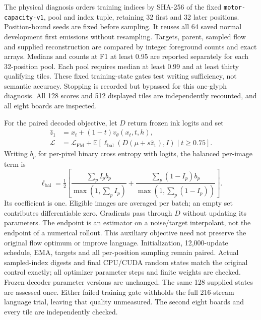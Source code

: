 The physical diagnosis orders training indices by SHA-256 of the fixed
\texttt{motor-capacity-v1}, pool and index tuple, retaining 32 first and 32
later positions. Position-bound seeds are fixed before sampling. It reuses
all 64 saved normal development first emissions without resampling. Targets,
parent, sampled flow and supplied reconstruction are compared by integer
foreground counts and exact arrays. Medians and counts at F1 at least 0.95
are reported separately for each 32-position pool. Each pool requires median
at least 0.99 and at least thirty qualifying tiles. These fixed training-state
gates test writing sufficiency, not semantic accuracy. Stopping is recorded
but bypassed for this one-glyph diagnosis. All 128 scores and 512 displayed
tiles are independently recounted, and all eight boards are inspected.

For the paired decoded objective, let $D$ return frozen ink logits and set
\begin{align}
 \widehat z_1&=x_t+(1-t)v_\theta(x_t,t,h),\\
 \mathcal L&=\mathcal L_\mathrm{FM}+
 \mathbb E[\ell_\mathrm{bal}(D(\mu+s\widehat z_1),I)\mid t\geq0.75].
\end{align}
Writing $b_p$ for per-pixel binary cross entropy with logits, the balanced
per-image term is
\[
 \ell_\mathrm{bal}=\tfrac12\left[
 \frac{\sum_p I_pb_p}{\max(1,\sum_p I_p)}+
 \frac{\sum_p(1-I_p)b_p}{\max(1,\sum_p(1-I_p))}\right].
\]
Its coefficient is one. Eligible images are averaged per batch; an empty set
contributes differentiable zero. Gradients pass through $D$ without updating
its parameters. The endpoint is an estimator on a noise/target interpolant,
not the endpoint of a numerical rollout. This auxiliary objective need not
preserve the original flow optimum or improve language. Initialization,
12,000-update schedule, EMA, targets and all per-position sampling remain
paired. Actual sampled-index digests and final CPU/CUDA random states match
the original control exactly; all optimizer parameter steps and finite
weights are checked. Frozen decoder parameter versions are unchanged.
The same 128 supplied states are assessed once. Either failed training gate
withholds the full 216-stream language trial, leaving that quality unmeasured.
The second eight boards and every tile are independently checked.

